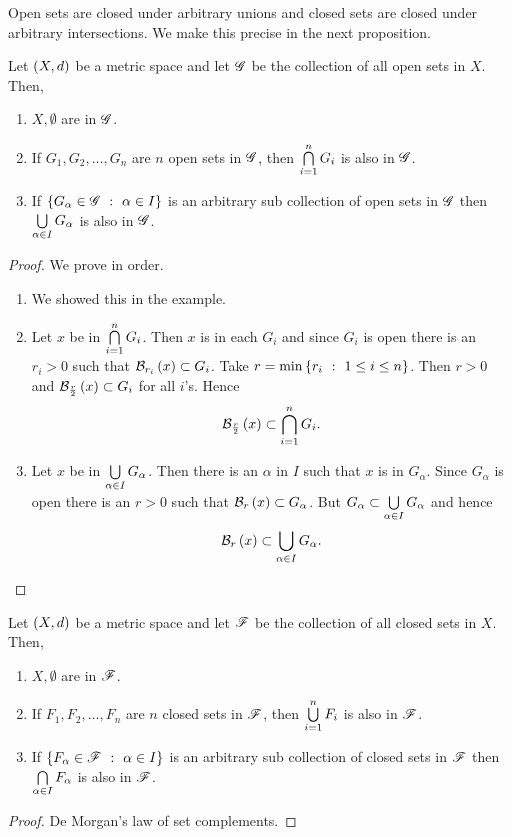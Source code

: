 Open sets are closed under arbitrary unions and closed sets are closed under arbitrary intersections. We make
this precise in the next proposition.
\begin{Proposition}\label{prop:open_sets_prop}
    Let $\metricS{X}{d}$ be a metric space and let $\famG$ be the collection of all open sets in $X$. Then,
    \begin{enumerate}
	\item $X,\emptyset$ are in $\famG$.
	\item If $G_1,G_2,\ldots,G_n$ are $n$ open sets in $\famG$, then $\finiteIntersection{G_i}{i}{n}$ is
	    also in $\famG$.
	\item If $\set{G_{\alpha}\in \famG}{\alpha \in I}$ is an arbitrary sub collection of open sets in
	    $\famG$ then $\indexUnion{G_{\alpha}}{\alpha}{I}$ is also in $\famG$.
    \end{enumerate}
\end{Proposition}
\begin{proof}
    We prove in order.
    \begin{enumerate}
	\item We showed this in the example.
	\item Let $x$ be in $\finiteIntersection{G_i}{i}{n}$. Then $x$ is in each $G_i$ and since $G_i$ is open
	    there is an $r_i > 0$ such that $\ball{r_i}{x} \subset G_i$. Take 
	    $r = \min\set{r_i}{1\leq i \leq n}$.
	    Then $r > 0$ and $\ball{\frac{r}{2}}{x} \subset G_i$ for all $i$'s. Hence
	    \[\ball{\frac{r}{2}}{x} \subset \finiteIntersection{G_i}{i}{n}.\]
	\item Let $x$ be in $\indexUnion{G_{\alpha}}{\alpha}{I}$. Then there is an $\alpha$ in $I$ such that
	    $x$ is in $G_{\alpha}$. Since $G_{\alpha}$ is open there is an $r > 0$ such that $\ball{r}{x}
	    \subset G_{\alpha}$. But $G_{\alpha} \subset \indexUnion{G_{\alpha}}{\alpha}{I}$ and hence 
	    \[\ball{r}{x} \subset \indexUnion{G_{\alpha}}{\alpha}{I}.\]
    \end{enumerate}
\end{proof}
\begin{Proposition}\label{prop:closed_sets_prop}
    Let $\metricS{X}{d}$ be a metric space and let $\famF$ be the collection of all closed sets in $X$. Then,
    \begin{enumerate}
	\item $X,\emptyset$ are in $\famF$.
	\item If $F_1,F_2,\ldots,F_n$ are $n$ closed sets in $\famF$, then $\finiteUnion{F_i}{i}{n}$ is
	    also in $\famF$.
	\item If $\set{F_{\alpha}\in \famF}{\alpha \in I}$ is an arbitrary sub collection of closed sets in
	    $\famF$ then $\indexIntersection{F_{\alpha}}{\alpha}{I}$ is also in $\famF$.
    \end{enumerate}
\end{Proposition}
\begin{proof}
    De Morgan's law of set complements.
\end{proof}

